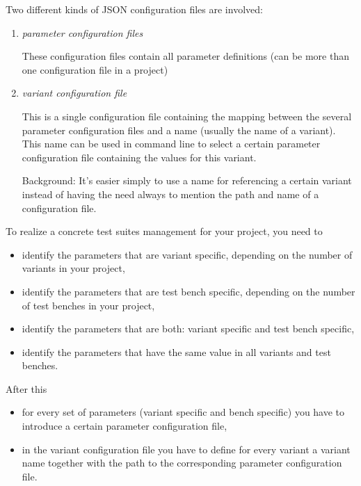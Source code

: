 Two different kinds of JSON configuration files are involved:

\begin{enumerate}
   \item \emph{parameter configuration files}

   These configuration files contain all parameter definitions (can be more than one configuration file in a project)

   \item \emph{variant configuration file}

   This is a single configuration file containing the mapping between the several parameter configuration files and a name
   (usually the name of a variant). This name can be used in command line to select a certain parameter configuration file
   containing the values for this variant.

   Background: It's easier simply to use a name for referencing a certain variant instead of having the need always to mention
   the path and name of a configuration file.
\end{enumerate}

To realize a concrete test suites management for your project, you need to

\begin{itemize}
   \item identify the parameters that are variant specific, depending on the number of variants in your project,
   \item identify the parameters that are test bench specific, depending on the number of test benches in your project,
   \item identify the parameters that are both: variant specific and test bench specific,
   \item identify the parameters that have the same value in all variants and test benches.
\end{itemize}

\newpage

After this

\begin{itemize}
   \item for every set of parameters (variant specific and bench specific) you have to introduce a certain parameter configuration file,
   \item in the variant configuration file you have to define for every variant a variant name together
         with the path to the corresponding parameter configuration file.
\end{itemize}


